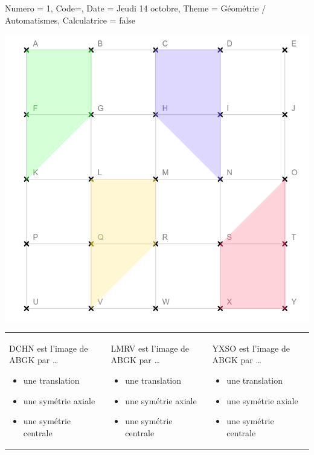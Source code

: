 \documentclass[11pt]{article}
\begin{document}
\begin{Maquette}[IE]{
        Numero = 1, Code={}, Date = Jeudi 14 octobre, Theme = Géométrie / Automatismes, Calculatrice = false
    }
    \begin{exercice}
        \begin{center}
            \includegraphics[width=.65\linewidth]{Images/Évaluation 2 - Quadrillage.png}
        \end{center}
        {\small
        \begin{tabularx}{\textwidth}{X|X|X}
            DCHN est l’image de ABGK par …

            \begin{itemize}[label=$\square$, itemsep=10pt, topsep=10pt]
                \item une translation
                \item une symétrie axiale
                \item une symétrie centrale
            \end{itemize}

                                    &

            LMRV est l’image de ABGK par …

            \begin{itemize}[label=$\square$, itemsep=10pt, topsep=10pt]
                \item une translation
                \item une symétrie axiale
                \item une symétrie centrale
            \end{itemize}

                                    &
            YXSO est l’image de ABGK par …

            \begin{itemize}[label=$\square$, itemsep=10pt, topsep=10pt]
                \item une translation
                \item une symétrie axiale
                \item une symétrie centrale
            \end{itemize}
        \end{tabularx}
        }
    \end{exercice}


\end{Maquette}
\end{document}
